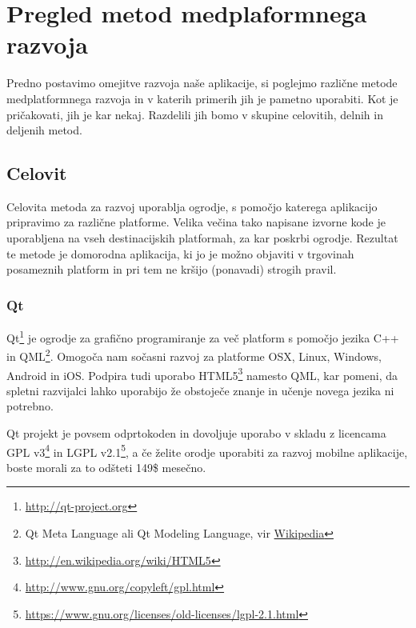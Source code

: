 \graphicspath{{img/}}








\chapter{Pregled metod medplaformnega razvoja}
\label{chap:overview}

Predno postavimo omejitve razvoja naše aplikacije, si poglejmo različne metode medplatformnega razvoja in v katerih primerih jih je pametno uporabiti. Kot je pričakovati, jih je kar nekaj. Razdelili jih bomo v skupine celovitih, delnih in deljenih metod.

\section{Celovit}

Celovita metoda za razvoj uporablja ogrodje, s pomočjo katerega aplikacijo pripravimo za različne platforme. Velika večina tako napisane izvorne kode je uporabljena na vseh destinacijskih platformah, za kar poskrbi ogrodje. Rezultat te metode je domorodna aplikacija, ki jo je možno objaviti v trgovinah posameznih platform in pri tem ne kršijo (ponavadi) strogih pravil.

\subsection{Qt}

Qt\footnote{\href{http://qt-project.org}{http://qt-project.org}} je ogrodje za grafično programiranje za več platform s pomočjo jezika C++ in QML\footnote{Qt Meta Language ali Qt Modeling Language, vir \href{http://en.wikipedia.org/wiki/QML}{Wikipedia}}. Omogoča nam sočasni razvoj za platforme OSX, Linux, Windows, Android in iOS. Podpira tudi uporabo HTML5\footnote{\href{http://en.wikipedia.org/wiki/HTML5}{http://en.wikipedia.org/wiki/HTML5}} namesto QML, kar pomeni, da spletni razvijalci lahko uporabijo že obstoječe znanje in učenje novega jezika ni potrebno.

Qt projekt je povsem odprtokoden in dovoljuje uporabo v skladu z licencama GPL v3\footnote{\href{http://www.gnu.org/copyleft/gpl.html}{http://www.gnu.org/copyleft/gpl.html}} in LGPL v2.1\footnote{\href{https://www.gnu.org/licenses/old-licenses/lgpl-2.1.html}{https://www.gnu.org/licenses/old-licenses/lgpl-2.1.html}}, a če želite orodje uporabiti za razvoj mobilne aplikacije, boste morali za to odšteti 149\$ mesečno.

